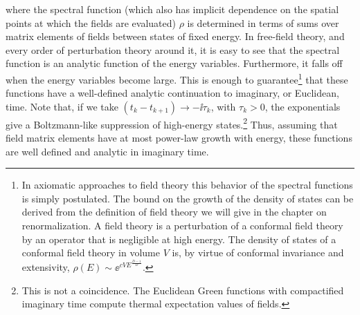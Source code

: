 where the spectral function (which also has implicit dependence on the spatial points at
which the fields are evaluated) $\rho$ is determined in terms of sums over matrix elements of
fields between states of fixed energy. In free-field theory, and every order of perturbation
theory around it, it is easy to see that the spectral function is an analytic function of the
energy variables. Furthermore, it falls off when the energy variables become large. This
is enough to guarantee\footnote[5]{In axiomatic approaches to field theory this behavior of the spectral functions is simply postulated. The bound on the growth of the density of states can be derived from the definition of field theory we will give in the chapter on renormalization. A field theory is a perturbation of a conformal field theory by an operator that is negligible at high energy. The density of states of a conformal field theory in volume $V$ is, by virtue of conformal invariance and extensivity, $\rho(E)\sim\ee^{cVE^{\frac{D-1}{D}}}$.} that these functions have a well-defined analytic continuation
to imaginary, or Euclidean, time. Note that, if we take $(t_k-t_{k+1})\to-\ii\tau_k$, with
$\tau_k>0$, the exponentials give a Boltzmann-like suppression of high-energy states.\footnote[6]{This is not a coincidence. The Euclidean Green functions with compactified imaginary time compute thermal expectation values of fields.} Thus, assuming that field matrix elements have at most power-law growth with energy,
these functions are well defined and analytic in imaginary time.

